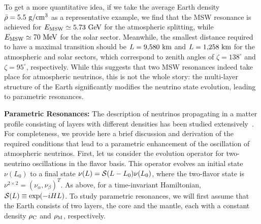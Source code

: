 To get a more quantitative idea, if we take the average Earth density $\bar{\rho} = 5.5 {\rm~g/cm^{3}}$ as a representative example, we find that the MSW resonance is achieved for $E_{\rm MSW}\simeq 5.73~{\rm GeV}$  for the atmospheric splitting, while  $E_{\rm MSW}\simeq 70~{\rm MeV}$ for the solar sector.
Meanwhile, the smallest distance required to have a maximal transition should be $L=9,\!580~{\rm km}$ and $L=1,\!258~{\rm km}$ for the atmospheric and solar sectors, which correspond to zenith angles of $\zeta = 138^{\circ}$ and $\zeta = 95^{\circ}$, respectively.
While this suggests that two MSW resonances indeed take place for atmospheric neutrinos, this is not the whole story: the multi-layer structure of the Earth significantly modifies the neutrino state evolution, leading to parametric resonances.

\textbf{Parametric Resonances:} The description of neutrinos propagating in a matter profile consisting of layers with different densities has been studied extensively~\cite{Akhmedov:1998ui,Akhmedov:1998xq,Chizhov:1998ug,Chizhov:1999az,Chizhov:1999he,Liu:1998nb,Peres:1999yi,Freund:1999vc,Palomares-Ruiz:2004cmm,Akhmedov:2005yj,Akhmedov:2006hb,Gandhi:2004bj,Gandhi:2004md,Kimura:2004vh,Gonzalez-Garcia:2004pfd,Liao:2007re,Akhmedov:2008qt,Jacobsson:2001zk,Ohlsson:1999um,Koike:2009xf,Akhmedov:2016hcb}.
For completeness, we provide here a brief discussion and derivation of the required conditions that lead to a parametric enhancement of the oscillation of atmospheric neutrinos. First, let us consider the evolution operator for two-neutrino oscillations in the flavor basis. This operator evolves an initial state $\nu(L_0)$ to a final state $\nu(L)={\cal S}(L-L_0)\nu(L_0)$, where the two-flavor state is $\nu^{2\times 2}=(\nu_\alpha, \nu_\beta)^T$. As above, for a time-invariant Hamiltonian, ${\cal S}(L)\equiv {\rm exp}(-iHL)$. To study parametric resonances, we will first assume that the Earth consists of two layers, the core and the mantle, each with a constant density $\rho_{\rm C}$ and $\rho_{\rm M}$, respectively.

